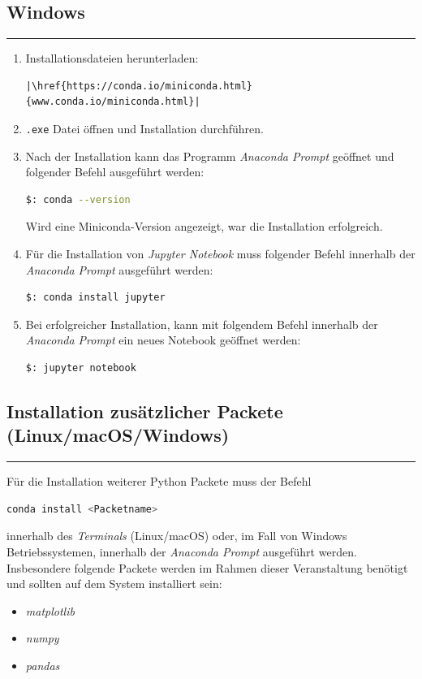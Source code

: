 \documentclass[11pt, a4paper, headheight=70pt]{scrartcl}
\newcommand{\subsecline}[1]{\subsection*{#1}
\vspace{-0.5cm}
\noindent\rule{\textwidth}{0.5pt}
\vspace{0cm}}
\begin{document}
\newpage

\subsecline{Windows}

\begin{enumerate}[itemsep=0.3cm]
\item Installationsdateien herunterladen:
\begin{lstlisting}[escapechar=|, basicstyle=\footnotesize]
|\href{https://conda.io/miniconda.html}{www.conda.io/miniconda.html}|
\end{lstlisting}

\item \texttt{.exe} Datei öffnen und Installation durchführen.

\item Nach der Installation kann das Programm \textit{Anaconda Prompt} geöffnet und folgender Befehl ausgeführt werden:
\begin{lstlisting}[backgroundcolor = \color{lightgray}, language = Bash, framerule=0pt, basicstyle=\small]
$: conda --version 
\end{lstlisting}
Wird eine Miniconda-Version angezeigt, war die Installation erfolgreich.

\item Für die Installation von \textit{Jupyter Notebook} muss folgender Befehl innerhalb der \textit{Anaconda Prompt} ausgeführt werden:
\begin{lstlisting}[backgroundcolor = \color{lightgray}, language = Bash, framerule=0pt, basicstyle=\small]
$: conda install jupyter
\end{lstlisting}

\item Bei erfolgreicher Installation, kann mit folgendem Befehl innerhalb der \textit{Anaconda Prompt} ein neues Notebook geöffnet werden:
\begin{lstlisting}[backgroundcolor = \color{lightgray}, language = Bash, framerule=0pt, basicstyle=\small]
$: jupyter notebook
\end{lstlisting}

\end{enumerate}

\subsecline{Installation zusätzlicher Packete (Linux/macOS/Windows)}

Für die Installation weiterer Python Packete muss der Befehl
\begin{lstlisting}[backgroundcolor = \color{lightgray}, language = Bash, framerule=0pt, basicstyle=\small]
conda install <Packetname>
\end{lstlisting}
\vspace{0.1cm}
innerhalb des \textit{Terminals} (Linux/macOS) oder, im Fall von Windows Betriebssystemen, innerhalb der \textit{Anaconda Prompt} ausgeführt werden. Insbesondere folgende Packete werden im Rahmen dieser Veranstaltung benötigt und sollten auf dem System installiert sein:
\vspace{0.3cm}
\begin{itemize}
\setlength\itemsep{3pt}
\item \textit{matplotlib}
\item \textit{numpy}
\item \textit{pandas}
\end{itemize}
\end{document}
